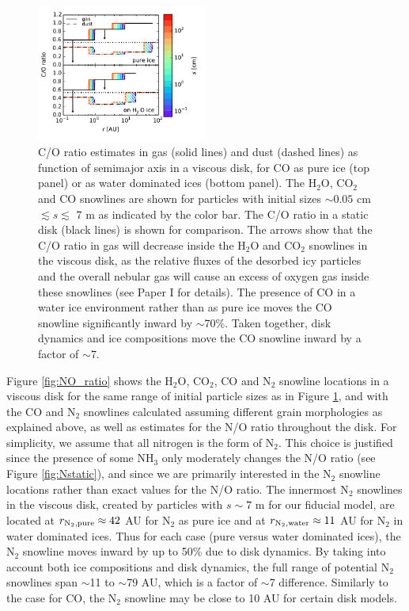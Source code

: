 \documentclass[apj]{emulateapj}
\begin{document}
\begin{figure}[h!]
\centering
\includegraphics[width=0.5\textwidth]{C_O_water_ice.pdf}
\caption{C/O ratio estimates in gas (solid lines) and dust (dashed lines) as function of semimajor axis in a viscous disk, for CO as pure ice (top panel) or as water dominated ices (bottom panel). The H$_2$O, CO$_2$ and CO snowlines are shown for particles with initial sizes $\sim0.05$ cm $\lesssim s \lesssim$ 7 m as indicated by the color bar. The C/O ratio in a static disk (black lines) is shown for comparison. The arrows show that the C/O ratio in gas will decrease inside the H$_2$O and CO$_2$
snowlines in the viscous disk, as the relative fluxes of the desorbed icy
particles and the overall nebular gas will cause an excess of oxygen gas inside these snowlines (see Paper I for details). The presence of CO in a water ice environment rather than as pure ice moves the CO snowline significantly inward by $\sim$70\%. Taken together, disk dynamics and ice compositions move the CO snowline inward by a factor of $\sim$7.} 
\label{fig:CO_ratio}
\end{figure}


Figure \ref{fig:NO_ratio} shows the H$_2$O, CO$_2$, CO and N$_2$ snowline locations in a viscous disk for the same range of initial particle sizes as in Figure \ref{fig:CO_ratio}, and with the CO and N$_2$ snowlines calculated assuming different grain morphologies as explained above, as well as estimates for the N/O ratio throughout the disk. For simplicity, we assume that all nitrogen is the form of N$_2$. This choice is justified since the presence of some NH$_3$ only moderately changes the N/O ratio (see Figure \ref{fig:Nstatic}), and since we are primarily interested in the N$_2$ snowline locations rather than exact values for the N/O ratio. The innermost N$_2$ snowlines in the viscous disk, created by particles with $s \sim 7$ m for our fiducial model, are located at $r_{\rm N_2, pure} \approx 42$ AU for N$_2$ as pure ice and at $r_{\rm N_2, water} \approx 11$ AU for N$_2$ in water dominated ices. Thus for each case (pure versus water dominated ices), the N$_2$ snowline moves inward by up to 50\% due to disk dynamics. By taking into account both ice compositions and disk dynamics, the full range of potential N$_2$ snowlines span $\sim$11 to $\sim$79 AU, which is a factor of $\sim$7 difference. Similarly to the case for CO, the N$_2$ snowline may be close to 10 AU for certain disk models. 
\end{document}
